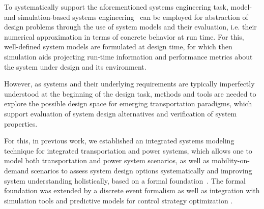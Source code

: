 \documentclass[a4paper,twoside]{article}
\begin{document}
	
	To systematically support the aforementioned systems engineering task, model- and simulation-based systems engineering~\cite{gianni2014modeling} can be employed for abstraction of design problems through the use of system models and their evaluation, i.e. their numerical approximation in terms of concrete behavior at run time. For this, well-defined system models are formulated at design time, for which then simulation aids projecting run-time information and performance metrics about the system under design and its environment. 

	However, as systems and their underlying requirements are typically imperfectly understood at the beginning of the design task, methods and tools are needed to explore the possible design space for emerging transportation paradigms, which support evaluation of system design alternatives and verification of system properties. 
	
	
	For this, in previous work, we established an integrated systems modeling technique for integrated transportation and power systems, which allows one to model both transportation and power system scenarios, as well as mobility-on-demand scenarios to assess system design options systematically and improving system understanding holistically, based on a formal foundation~\cite{ascher_hackenberg_2014,ascher_hackenberg_2015,ascher_hackenberg_2016,ascher_hackenberg_2017}. The formal foundation was extended by a discrete event formalism \cite{ascher2023discrete} as well as integration with simulation tools and predictive models for control strategy optimization \cite{ascher_hackenberg_albayrak_2023}.
	
\end{document}
